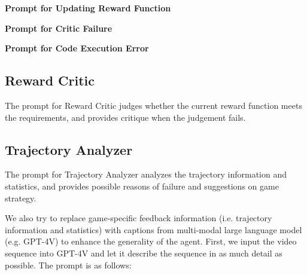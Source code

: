 \begin{onecolumn}
\noindent\textbf{Prompt for Updating Reward Function}
\begin{tcolorbox}[breakable=true, boxrule={0.5pt}, sharp corners={all}]
\setlength{\parskip}{1ex}
\small
   
\end{tcolorbox}


\noindent\textbf{Prompt for Critic Failure}
\begin{tcolorbox}[breakable=true, boxrule={0.5pt}, sharp corners={all}]
\setlength{\parskip}{1ex}
\small
   
\end{tcolorbox}


\noindent\textbf{Prompt for Code Execution Error}
\begin{tcolorbox}[breakable=true, boxrule={0.5pt}, sharp corners={all}]
\setlength{\parskip}{1ex}
\small
    
\end{tcolorbox}


\clearpage
\subsection{Reward Critic}
The prompt for Reward Critic judges whether the current reward function meets the requirements, and provides critique when the judgement fails.
\begin{tcolorbox}[breakable=true, boxrule={0.5pt}, sharp corners={all}]
\setlength{\parskip}{1ex}
\small
  
\end{tcolorbox}

\clearpage
\subsection{Trajectory Analyzer}
The prompt for Trajectory Analyzer analyzes the trajectory information and statistics, and provides possible reasons of failure and suggestions on game strategy.
\begin{tcolorbox}[breakable=true, boxrule={0.5pt}, sharp corners={all}]
\setlength{\parskip}{1ex}
\small
  
\end{tcolorbox} 

We also try to replace game-specific feedback information (i.e. trajectory information and statistics) with captions from multi-modal large language model (e.g. GPT-4V) to enhance the generality of the agent. First, we input the video sequence into GPT-4V and let it describe the sequence in as much detail as possible. The prompt is as follows:
\begin{tcolorbox}[breakable=true, boxrule={0.5pt}, sharp corners={all}]
\setlength{\parskip}{1ex}
\small
   
\end{tcolorbox}


\end{onecolumn}
